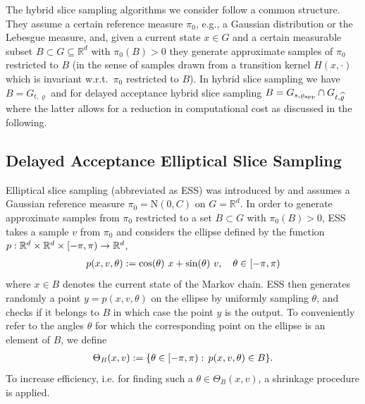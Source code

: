 \documentclass[sn-mathphys-num]{sn-jnl}%
\theoremstyle{thmstyleone}%
\theoremstyle{thmstyletwo}%
\theoremstyle{thmstylethree}%
\newcommand{\rhoapp}{\varrho_{{\rm app}}}
\newcommand{\change}[1]{\bgroup\color{black}#1\egroup}    %
\begin{document}
The hybrid slice sampling algorithms we consider follow a common structure. They assume a certain reference measure $\pi_0$, e.g., a Gaussian distribution or the Lebesgue measure, and, given a current state $x\in G$ and a certain measurable subset $B \subset G \subseteq \mathbb{R}^d$ with $\pi_0(B)>0$ they generate approximate samples of $\pi_0$ restricted to $B$ (in the sense of samples drawn from a transition kernel $H(x, \cdot)$ which is invariant w.r.t.~$\pi_0$ restricted to $B$).
In hybrid slice sampling we have $B = G_{t,\varrho}$ and for delayed acceptance hybrid slice sampling $B = G_{s,\rhoapp} \cap G_{t,\widehat{\varrho}}$ where the latter allows for a reduction in computational cost as discussed in the following. 

\subsection{Delayed Acceptance Elliptical Slice Sampling}
\label{sec:DA-ESS}
Elliptical slice sampling (abbreviated as ESS) was introduced by \citet{MurrayEtAl2010} and assumes a Gaussian reference measure $\pi_0=\mathrm{N}(0,C)$ on $G=\mathbb{R}^d$. 
In order to generate approximate samples from $\pi_0$ restricted to a set $B\subset G$ with $\pi_0(B)>0$, ESS takes a sample $v$ from $\pi_0$ and considers the ellipse defined by the function $p: \mathbb{R}^d \times \mathbb{R}^d \times \change{[-\pi,\pi)} %
\rightarrow \mathbb{R}^d$,
\begin{align*}
	p(x, v, \theta) := \cos(\theta) \ x + \sin(\theta)\ v, \quad \theta\in\change{[-\pi,\pi)} %
\end{align*}
where $x\in B$ denotes the current state of the Markov chain.
ESS then generates randomly a point $y = p(x,v,\theta)$ on the ellipse by uniformly sampling $\theta$, and checks if it belongs to $B$ in which case the point $y$ is the output.
To conveniently refer to the angles $\theta$ for which the corresponding point on the ellipse is an element of $B$, we define
\begin{align}\label{eq:theta_B_def}
   \Theta_B(x,v):=\{\theta\in\change{[-\pi,\pi)}: \, p(x, v, \theta)\in B\}.
\end{align}
To increase efficiency, i.e. for finding such a $\theta\in\Theta_B(x,v)$, a shrinkage procedure is applied. 
\end{document}
